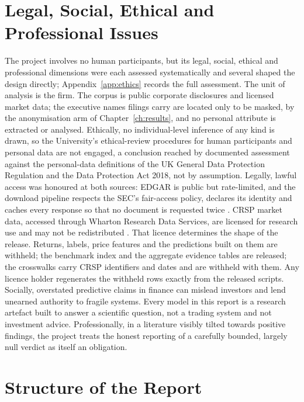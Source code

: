 \section{Legal, Social, Ethical and Professional Issues}
\label{sec:intro-ethics}

The project involves no human participants, but its legal, social, ethical and professional dimensions were each assessed systematically and several shaped the design directly; Appendix~\ref{app:ethics} records the full assessment. The unit of analysis is the firm. The corpus is public corporate disclosures and licensed market data; the executive names filings carry are located only to be masked, by the anonymisation arm of Chapter~\ref{ch:results}, and no personal attribute is extracted or analysed. Ethically, no individual-level inference of any kind is drawn, so the University's ethical-review procedures for human participants and personal data are not engaged, a conclusion reached by documented assessment against the personal-data definitions of the UK General Data Protection Regulation and the Data Protection Act 2018, not by assumption. Legally, lawful access was honoured at both sources: EDGAR is public but rate-limited, and the download pipeline respects the SEC's fair-access policy, declares its identity and caches every response so that no document is requested twice \cite{sec2024edgar}. CRSP market data, accessed through Wharton Research Data Services, are licensed for research use and may not be redistributed \cite{crsp2026data}. That licence determines the shape of the release. Returns, labels, price features and the predictions built on them are withheld; the benchmark index and the aggregate evidence tables are released; the crosswalks carry CRSP identifiers and dates and are withheld with them. Any licence holder regenerates the withheld rows exactly from the released scripts. Socially, overstated predictive claims in finance can mislead investors and lend unearned authority to fragile systems. Every model in this report is a research artefact built to answer a scientific question, not a trading system and not investment advice. Professionally, in a literature visibly tilted towards positive findings, the project treats the honest reporting of a carefully bounded, largely null verdict as itself an obligation.

\section{Structure of the Report}
\label{sec:intro-structure}

